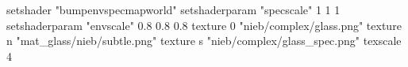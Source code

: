 setshader "bumpenvspecmapworld"
setshaderparam "specscale" 1 1 1
setshaderparam "envscale"  0.8 0.8 0.8
    texture 0 "nieb/complex/glass.png"
    texture n "mat_glass/nieb/subtle.png"
    texture s "nieb/complex/glass_spec.png"
    texscale 4